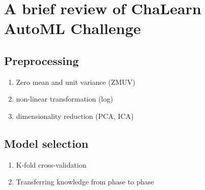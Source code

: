\section{A brief review of ChaLearn AutoML Challenge}     \cite{guyon2016brief}

\subsection{Preprocessing}
    \begin{enumerate}
        \item Zero mean and unit variance (ZMUV)
        \item non-linear transformation (log)
        \item dimensionality reduction (PCA, ICA)
    \end{enumerate}

\subsection{Model selection}
    \begin{enumerate}
        \item K-fold cross-validation
        \item Transferring knowledge from phase to phase
    \end{enumerate}
